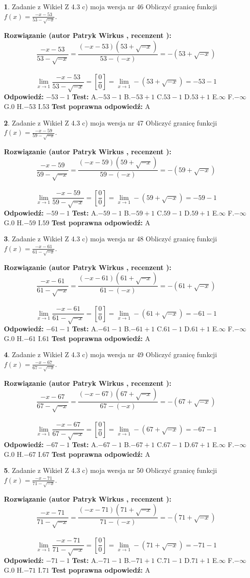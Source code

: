 \documentclass[12pt, a4paper]{article}
\theoremstyle{definition} %
\newtheorem{zad}{}
\newcommand{\zadStart}[1]{\begin{zad}#1\newline}
\newcommand{\zadStop}{\end{zad}}
\newcommand{\rozwStart}[2]{\noindent \textbf{Rozwiązanie (autor #1 , recenzent #2): }\newline}
\newcommand{\rozwStop}{\newline}
\newcommand{\odpStart}{\noindent \textbf{Odpowiedź:}\newline}
\newcommand{\odpStop}{\newline}
\newcommand{\testStart}{\noindent \textbf{Test:}\newline}
\newcommand{\testStop}{\newline}
\newcommand{\kluczStart}{\noindent \textbf{Test poprawna odpowiedź:}\newline}
\newcommand{\kluczStop}{\newline}
\begin{document}
\zadStart{Zadanie z Wikieł Z 4.3 c) moja wersja nr 46}
Obliczyć granicę funkcji $f(x)=\frac{-x-53}{53-\sqrt{-x}}$.
\zadStop
\rozwStart{Patryk Wirkus}{}
$$\frac{-x-53}{53-\sqrt{-x}}=\frac{(-x-53)(53+\sqrt{-x})}{53-(-x)}=-(53+\sqrt{-x})$$
\\
$$\lim\limits_{x\to1}\frac{-x-53}{53-\sqrt{-x}}=[\frac{0}{0}]=\lim\limits_{x\to1}-(53+\sqrt{-x}) =-53-1$$
\rozwStop
\odpStart
$-53-1$
\odpStop
\testStart
A.$-53-1$
B.$-53+1$
C.$53-1$
D.$53+1$
E.$\infty$
F.$-\infty$
G.$0$
H.$-53$
I.$53$
\testStop
\kluczStart
A
\kluczStop



\zadStart{Zadanie z Wikieł Z 4.3 c) moja wersja nr 47}
Obliczyć granicę funkcji $f(x)=\frac{-x-59}{59-\sqrt{-x}}$.
\zadStop
\rozwStart{Patryk Wirkus}{}
$$\frac{-x-59}{59-\sqrt{-x}}=\frac{(-x-59)(59+\sqrt{-x})}{59-(-x)}=-(59+\sqrt{-x})$$
\\
$$\lim\limits_{x\to1}\frac{-x-59}{59-\sqrt{-x}}=[\frac{0}{0}]=\lim\limits_{x\to1}-(59+\sqrt{-x}) =-59-1$$
\rozwStop
\odpStart
$-59-1$
\odpStop
\testStart
A.$-59-1$
B.$-59+1$
C.$59-1$
D.$59+1$
E.$\infty$
F.$-\infty$
G.$0$
H.$-59$
I.$59$
\testStop
\kluczStart
A
\kluczStop



\zadStart{Zadanie z Wikieł Z 4.3 c) moja wersja nr 48}
Obliczyć granicę funkcji $f(x)=\frac{-x-61}{61-\sqrt{-x}}$.
\zadStop
\rozwStart{Patryk Wirkus}{}
$$\frac{-x-61}{61-\sqrt{-x}}=\frac{(-x-61)(61+\sqrt{-x})}{61-(-x)}=-(61+\sqrt{-x})$$
\\
$$\lim\limits_{x\to1}\frac{-x-61}{61-\sqrt{-x}}=[\frac{0}{0}]=\lim\limits_{x\to1}-(61+\sqrt{-x}) =-61-1$$
\rozwStop
\odpStart
$-61-1$
\odpStop
\testStart
A.$-61-1$
B.$-61+1$
C.$61-1$
D.$61+1$
E.$\infty$
F.$-\infty$
G.$0$
H.$-61$
I.$61$
\testStop
\kluczStart
A
\kluczStop



\zadStart{Zadanie z Wikieł Z 4.3 c) moja wersja nr 49}
Obliczyć granicę funkcji $f(x)=\frac{-x-67}{67-\sqrt{-x}}$.
\zadStop
\rozwStart{Patryk Wirkus}{}
$$\frac{-x-67}{67-\sqrt{-x}}=\frac{(-x-67)(67+\sqrt{-x})}{67-(-x)}=-(67+\sqrt{-x})$$
\\
$$\lim\limits_{x\to1}\frac{-x-67}{67-\sqrt{-x}}=[\frac{0}{0}]=\lim\limits_{x\to1}-(67+\sqrt{-x}) =-67-1$$
\rozwStop
\odpStart
$-67-1$
\odpStop
\testStart
A.$-67-1$
B.$-67+1$
C.$67-1$
D.$67+1$
E.$\infty$
F.$-\infty$
G.$0$
H.$-67$
I.$67$
\testStop
\kluczStart
A
\kluczStop



\zadStart{Zadanie z Wikieł Z 4.3 c) moja wersja nr 50}
Obliczyć granicę funkcji $f(x)=\frac{-x-71}{71-\sqrt{-x}}$.
\zadStop
\rozwStart{Patryk Wirkus}{}
$$\frac{-x-71}{71-\sqrt{-x}}=\frac{(-x-71)(71+\sqrt{-x})}{71-(-x)}=-(71+\sqrt{-x})$$
\\
$$\lim\limits_{x\to1}\frac{-x-71}{71-\sqrt{-x}}=[\frac{0}{0}]=\lim\limits_{x\to1}-(71+\sqrt{-x}) =-71-1$$
\rozwStop
\odpStart
$-71-1$
\odpStop
\testStart
A.$-71-1$
B.$-71+1$
C.$71-1$
D.$71+1$
E.$\infty$
F.$-\infty$
G.$0$
H.$-71$
I.$71$
\testStop
\kluczStart
A
\kluczStop
\end{document}
